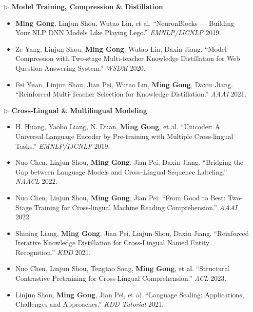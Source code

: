 \documentclass[10.5pt,letterpaper]{article}
\begin{document}
\noindent\textcolor{accent}{\textbf{$\triangleright$ Model Training, Compression \& Distillation}}
\begin{itemize}
  \item \textbf{Ming Gong}, Linjun Shou, Wutao Lin, et al. ``NeuronBlocks --- Building Your NLP DNN Models Like Playing Lego.'' \textit{EMNLP/IJCNLP} 2019.
  \item Ze Yang, Linjun Shou, \textbf{Ming Gong}, Wutao Lin, Daxin Jiang. ``Model Compression with Two-stage Multi-teacher Knowledge Distillation for Web Question Answering System.'' \textit{WSDM} 2020.
  \item Fei Yuan, Linjun Shou, Jian Pei, Wutao Lin, \textbf{Ming Gong}, Daxin Jiang. ``Reinforced Multi-Teacher Selection for Knowledge Distillation.'' \textit{AAAI} 2021.
\end{itemize}

\noindent\textcolor{accent}{\textbf{$\triangleright$ Cross-Lingual \& Multilingual Modeling}}
\begin{itemize}
  \item H. Huang, Yaobo Liang, N. Duan, \textbf{Ming Gong}, et al. ``Unicoder: A Universal Language Encoder by Pre-training with Multiple Cross-lingual Tasks.'' \textit{EMNLP/IJCNLP} 2019.
  \item Nuo Chen, Linjun Shou, \textbf{Ming Gong}, Jian Pei, Daxin Jiang. ``Bridging the Gap between Language Models and Cross-Lingual Sequence Labeling.'' \textit{NAACL} 2022.
  \item Nuo Chen, Linjun Shou, \textbf{Ming Gong}, Jian Pei. ``From Good to Best: Two-Stage Training for Cross-lingual Machine Reading Comprehension.'' \textit{AAAI} 2022.
  \item Shining Liang, \textbf{Ming Gong}, Jian Pei, Linjun Shou, Daxin Jiang. ``Reinforced Iterative Knowledge Distillation for Cross-Lingual Named Entity Recognition.'' \textit{KDD} 2021.
  \item Nuo Chen, Linjun Shou, Tengtao Song, \textbf{Ming Gong}, et al. ``Structural Contrastive Pretraining for Cross-Lingual Comprehension.'' \textit{ACL} 2023.
  \item Linjun Shou, \textbf{Ming Gong}, Jian Pei, et al. ``Language Scaling: Applications, Challenges and Approaches.'' \textit{KDD Tutorial} 2021.
\end{itemize}
\end{document}
